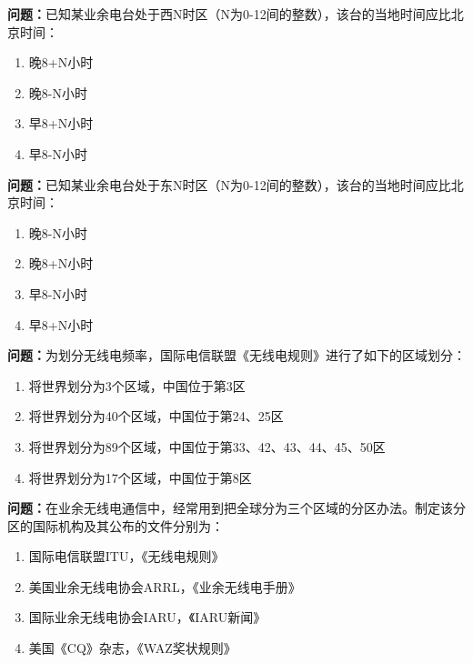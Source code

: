 \bigskip


\noindent\textbf{问题：}已知某业余电台处于西N时区（N为0-12间的整数），该台的当地时间应比北京时间：
\begin{enumerate}[label=\Alph*), leftmargin=3em]
\item 晚8+N小时
\item 晚8-N小时
\item 早8+N小时
\item 早8-N小时
\end{enumerate}

\bigskip


\noindent\textbf{问题：}已知某业余电台处于东N时区（N为0-12间的整数），该台的当地时间应比北京时间：
\begin{enumerate}[label=\Alph*), leftmargin=3em]
\item 晚8-N小时
\item 晚8+N小时
\item 早8-N小时
\item 早8+N小时
\end{enumerate}

\bigskip


\noindent\textbf{问题：}为划分无线电频率，国际电信联盟《无线电规则》进行了如下的区域划分：
\begin{enumerate}[label=\Alph*), leftmargin=3em]
\item 将世界划分为3个区域，中国位于第3区
\item 将世界划分为40个区域，中国位于第24、25区
\item 将世界划分为89个区域，中国位于第33、42、43、44、45、50区
\item 将世界划分为17个区域，中国位于第8区
\end{enumerate}

\bigskip


\noindent\textbf{问题：}在业余无线电通信中，经常用到把全球分为三个区域的分区办法。制定该分区的国际机构及其公布的文件分别为：
\begin{enumerate}[label=\Alph*), leftmargin=3em]
\item 国际电信联盟ITU，《无线电规则》
\item 美国业余无线电协会ARRL，《业余无线电手册》
\item 国际业余无线电协会IARU，《IARU新闻》
\item 美国《CQ》杂志，《WAZ奖状规则》
\end{enumerate}

\bigskip



